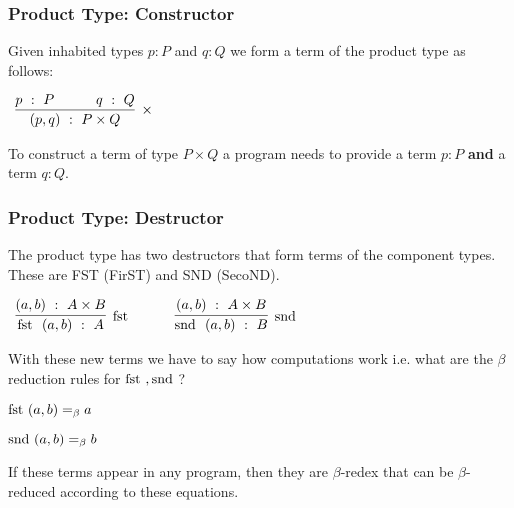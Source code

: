\documentclass{beamer}
\theoremstyle{indentDefn} \newtheorem{defn}[]{Definition}
\begin{document}
  
  \begin{frame}
  	\frametitle{Product Type: Constructor}  
  
    Given inhabited types $p : P$ and $q : Q$ we form a term of the product type as follows: 

  \begin{center}
    $\begin{array}{c}		
      \infer[\times]{(p,q) \ : \ P \times Q}
        {p \ : \ P \quad & \quad q \ : \ Q}	
    \end{array}$
  \end{center}

  To construct a term of type $P \times Q$ a program needs to provide a term $p :P$ {\bf and} a term $q : Q$. 
  
  \vspace{50mm}

\end{frame}

\begin{frame}
 \frametitle{Product Type: Destructor}

 The product type has two destructors that form terms of the component types. These are FST (FirST) and SND (SecoND). 

 \begin{center}
   $\begin{array}{c c c}
     \infer[\text{\fst}]{\fst \ (a,b) \ : \ A}{(a,b) \ : \ A\times B}

     &
     \quad
     &

     \infer[\text{\snd}]{\snd \ (a,b) \ : \ B}{(a,b) \ : \ A\times B}

   \end{array}$
 \end{center}

 With these new terms we have to say how computations work i.e. what are the $\beta$ reduction rules for $\text{fst }, \text{snd }$?

 \begin{center}
   $\text{fst } (a,b) =_{\beta} a$ 

   $\text{snd } (a,b) =_{\beta} b$ 
 \end{center}

 If these terms appear in any program, then they are $\beta$-redex that can be $\beta$-reduced according to these equations.
 
 \vspace{25mm}

\end{frame}
\end{document}
